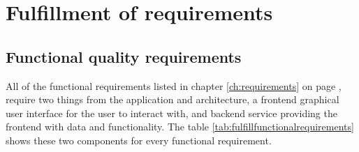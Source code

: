 \section{Fulfillment of requirements}\label{con_fullfill}

\subsection{Functional quality requirements}
All of the functional requirements listed in chapter \ref{ch:requirements} on page \pageref{ch:requirements}, require two things from the application and architecture, a frontend graphical user interface for the user to interact with, and backend service providing the frontend with data and functionality. The table \ref{tab:fulfillfunctionalrequirements} shows these two components for every functional requirement.
